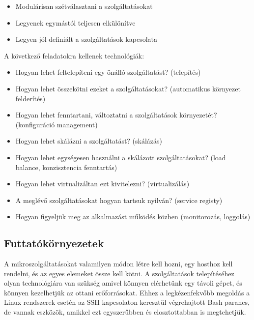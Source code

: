 \documentclass[11pt,magyar,a4paper,twoside,]{report}
\providecommand{\tightlist}{%
  \setlength{\itemsep}{0pt}\setlength{\parskip}{0pt}}
\begin{document}
\begin{itemize}
\tightlist
\item
  Modulárisan szétválasztani a szolgáltatásokat
\item
  Legyenek egymástól teljesen elkülönítve
\item
  Legyen jól definiált a szolgáltatások kapcsolata
\end{itemize}

A következő feladatokra kellenek technológiák:

\begin{itemize}
\tightlist
\item
  Hogyan lehet feltelepíteni egy önálló szolgáltatást? (telepítés)
\item
  Hogyan lehet összekötni ezeket a szolgáltatásokat? (automatikus
  környezet felderítés)
\item
  Hogyan lehet fenntartani, változtatni a szolgáltatások környezetét?
  (konfiguráció management)
\item
  Hogyan lehet skálázni a szolgáltatást? (skálázás)
\item
  Hogyan lehet egységesen használni a skálázott szolgáltatásokat? (load
  balance, konzisztencia fenntartás)
\item
  Hogyan lehet virtualizáltan ezt kivitelezni? (virtualizálás)
\item
  A meglévő szolgáltatásokat hogyan tartsuk nyilván? (service registy)
\item
  Hogyan figyeljük meg az alkalmazást működés közben (monitorozás,
  loggolás)
\end{itemize}

\subsection{Futtatókörnyezetek}\label{futtatuxf3kuxf6rnyezetek}

A mikroszolgáltatásokat valamilyen módon létre kell hozni, egy hosthoz
kell rendelni, és az egyes elemeket össze kell kötni. A szolgáltatások
telepítéséhez olyan technológiára van szükség amivel könnyen elérhetünk
egy távoli gépet, és könnyen kezelhetjük az ottani erőforrásokat. Ehhez
a legkézenfekvőbb megoldás a Linux rendszerek esetén az SSH kapcsolaton
keresztül végrehajtott Bash parancs, de vannak eszközök, amikkel ezt
egyszerűbben és elosztottabban is megtehetjük.
\end{document}
